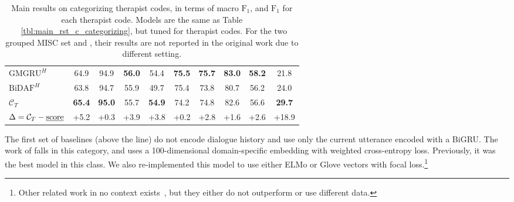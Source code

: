 \begin{table}[!htp]
\begin{center}
{\begin{tabular}{lccccccccc}
$\text{GMGRU}^{H}$                             & 64.9                 & 94.9                 & {\bf 56.0}           & 54.4             & {\bf 75.5}       & {\bf 75.7}       & {\bf 83.0}       & {\bf 58.2}       & 21.8             \\
$\text{BiDAF}^{H}$                             & 63.8                 & 94.7                 & 55.9                 & 49.7             & 75.4             & 73.8             & 80.7             & 56.2             & 24.0             \\ \midrule
$\mathcal{C}_{T}$                              & {\bf 65.4}           & {\bf 95.0}           & 55.7                 & {\bf 54.9}       & 74.2             & 74.8             & 82.6             & 56.6             & {\bf 29.7}       \\
$\Delta=\mathcal{C}_{T} - \text{\underline{score}}$ & {\footnotesize +5.2} & {\footnotesize +0.3} & {\footnotesize +3.9} & {\footnotesize +3.8} & {\footnotesize +0.2} & {\footnotesize +2.8} & {\footnotesize +1.6} & {\footnotesize +2.6} & {\footnotesize +18.9}                                                                                                \\ \bottomrule
\end{tabular}}
\end{center}
\caption{\label{tbl:main_rst_t_categorizing} Main results on
  categorizing therapist codes, in terms of macro $\text{F}_{1}$, and
  $\text{F}_{1}$ for each therapist code. Models are the same as Table
  ~\ref{tbl:main_rst_c_categorizing}, but tuned for therapist
  codes. For the two grouped MISC set \MIA and \MIN, their results are
  not reported in the original work due to different setting.}
\end{table}



The first set of baselines (above the line) do not encode dialogue
history and use only the current utterance encoded with a BiGRU. The
work of \citet{xiao2016behavioral} falls in this category, and uses a
100-dimensional domain-specific embedding with weighted cross-entropy
loss. Previously, it was the best model in this class. We also
re-implemented this model to use either ELMo or Glove vectors with
focal loss.\footnote{Other related work in no context
  exists~\cite[e.g.,][]{perez2017predicting, gibson2017attention}, but
  they either do not outperform \cite{xiao2016behavioral} or use
  different data.}

